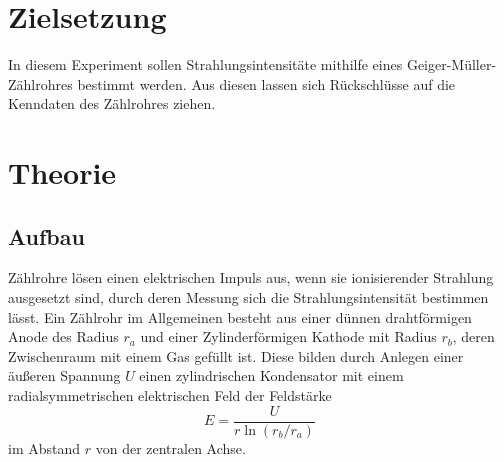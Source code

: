 \documentclass{scrartcl}
\begin{document}
\section{Zielsetzung}
In diesem Experiment sollen Strahlungsintensitäte mithilfe eines Geiger-Müller-Zählrohres bestimmt werden. Aus diesen lassen sich Rückschlüsse auf die Kenndaten des Zählrohres ziehen.
\section{Theorie}
\subsection{Aufbau}
Zählrohre lösen einen elektrischen Impuls aus, wenn sie ionisierender Strahlung ausgesetzt sind, durch deren Messung sich die Strahlungsintensität bestimmen lässt.
Ein Zählrohr im Allgemeinen besteht aus einer dünnen drahtförmigen Anode des Radius $r_a$ und einer Zylinderförmigen Kathode mit Radius $r_b$, deren Zwischenraum mit einem Gas gefüllt ist. Diese bilden durch Anlegen einer äußeren Spannung $U$ einen zylindrischen Kondensator mit einem radialsymmetrischen elektrischen Feld der Feldstärke
\begin{equation*}
E=\frac{U}{r\ln(r_b/r_a)}
\end{equation*}
im Abstand $r$ von der zentralen Achse.
\end{document}
